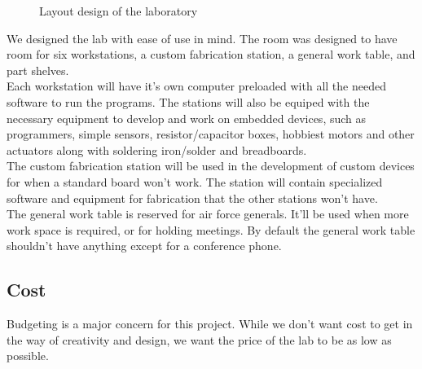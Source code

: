 \documentclass[12pt]{article}
\begin{document}
\begin{figure}[h!]
  \centering
  \label{fig:layout}
  \caption{Layout design of the laboratory}
\end{figure}
\noindent
We designed the lab with ease of use in mind. The room was designed to have room for six workstations, a custom fabrication station, a general work table, and part shelves.  \\

\noindent
Each workstation will have it's own computer preloaded with all the needed software to run the programs. The stations will also be equiped with the necessary equipment to develop and work on embedded devices, such as programmers, simple sensors, resistor/capacitor boxes, hobbiest motors and other actuators along with soldering iron/solder and breadboards. \\

\noindent
The custom fabrication station will be used in the development of custom devices for when a standard board won't work. The station will contain specialized software and equipment for fabrication that the other stations won't have.\\

\noindent
The general work table is reserved for air force generals. It'll be used when more work space is required, or for holding meetings. By default the general work table shouldn't have anything except for a conference phone.

\subsection{Cost}
\noindent
Budgeting is a major concern for this project. While we don't want cost to get in the way of creativity and design, we want the price of the lab to be as low as possible. \\
\end{document}
